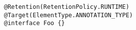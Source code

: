 \begin{listing}
    \centering
    \begin{verbatim}
@Retention(RetentionPolicy.RUNTIME)
@Target(ElementType.ANNOTATION_TYPE)
@interface Foo {}
    \end{verbatim}
    \caption{
        Example code for Java's annotation declaration.
    }
    \label{lst:java-annotation-declaration}
\end{listing}